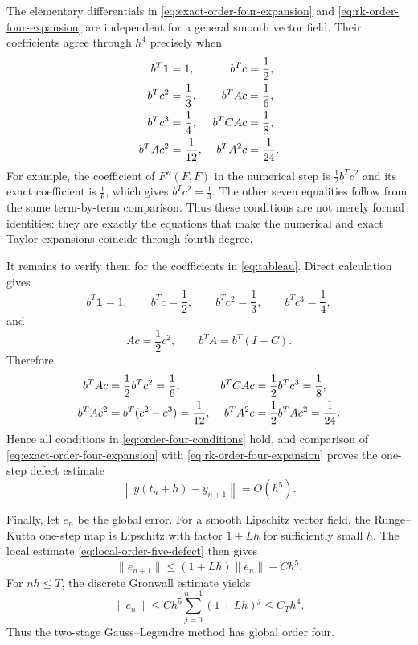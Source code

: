 \documentclass[11pt,a4paper]{article}
\begin{document}
The elementary differentials in
\eqref{eq:exact-order-four-expansion} and
\eqref{eq:rk-order-four-expansion} are independent for a general smooth
vector field.  Their coefficients agree through $h^4$ precisely when
\begin{align}
 b^T\mathbf{1}&=1,
 &b^Tc&=\frac12,
 \notag\\
 b^Tc^2&=\frac13,
 &b^TAc&=\frac16,
 \notag\\
 b^Tc^3&=\frac14,
 &b^TCAc&=\frac18,
 \notag\\
 b^TAc^2&=\frac1{12},
 &b^TA^2c&=\frac1{24}.
 \label{eq:order-four-conditions}
\end{align}
For example, the coefficient of $F''(F,F)$ in the numerical step is
$\tfrac12b^Tc^2$ and its exact coefficient is $\tfrac16$, which gives
$b^Tc^2=\tfrac13$.  The other seven equalities follow from the same
term-by-term comparison.  Thus these conditions are not merely formal
identities: they are exactly the equations that make the numerical and exact
Taylor expansions coincide through fourth degree.

It remains to verify them for the coefficients in \eqref{eq:tableau}.  Direct
calculation gives
\begin{equation}
 b^T\mathbf{1}=1,
 \qquad
 b^Tc=\frac12,
 \qquad
 b^Tc^2=\frac13,
 \qquad
 b^Tc^3=\frac14,
 \label{eq:gauss-moment-identities}
\end{equation}
and
\begin{equation}
 Ac=\frac12c^2,
 \qquad
 b^TA=b^T(I-C).
 \label{eq:gauss-stage-order-identities}
\end{equation}
Therefore
\begin{align}
 b^TAc&=\frac12b^Tc^2=\frac16,
 &b^TCAc&=\frac12b^Tc^3=\frac18,
 \notag\\
 b^TAc^2&=b^T(c^2-c^3)=\frac1{12},
 &b^TA^2c&=\frac12b^TAc^2=\frac1{24}.
 \label{eq:gauss-remaining-order-identities}
\end{align}
Hence all conditions in \eqref{eq:order-four-conditions} hold, and comparison
of \eqref{eq:exact-order-four-expansion} with
\eqref{eq:rk-order-four-expansion} proves the one-step defect estimate
\begin{equation}
 \left\lVert y(t_n+h)-y_{n+1}\right\rVert=O(h^5).
 \label{eq:local-order-five-defect}
\end{equation}

Finally, let $e_n$ be the global error.  For a smooth Lipschitz vector field,
the Runge--Kutta one-step map is Lipschitz with factor $1+Lh$ for sufficiently
small $h$.  The local estimate \eqref{eq:local-order-five-defect} then gives
\begin{equation}
 \lVert e_{n+1}\rVert
 \leq(1+Lh)\lVert e_n\rVert+Ch^5.
 \label{eq:global-error-recurrence}
\end{equation}
For $nh\leq T$, the discrete Gronwall estimate yields
\begin{equation}
 \lVert e_n\rVert
 \leq Ch^5\sum_{j=0}^{n-1}(1+Lh)^j
 \leq C_T h^4.
 \label{eq:global-order-four-bound}
\end{equation}
Thus the two-stage Gauss--Legendre method has global order four.
\end{document}
